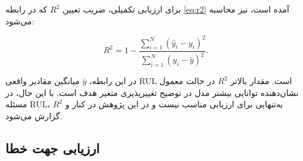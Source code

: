 برای ارزیابی تکمیلی، ضریب تعیین $R^2$ که در رابطه 
\ref{eq:r2}
آمده است، نیز محاسبه می‌شود:

\begin{equation}
	\label{eq:r2}
	R^2
	=
	1-
	\frac{
		\sum_{i=1}^{N}
		(\hat{y}_i-y_i)^2
	}{
		\sum_{i=1}^{N}
		(y_i-\bar{y})^2
	}.
\end{equation}

در این رابطه، $\bar{y}$ میانگین مقادیر واقعی \gls{RUL} است.
مقدار بالاتر $R^2$ در حالت معمول نشان‌دهنده توانایی بیشتر مدل در
توضیح تغییرپذیری متغیر هدف است. با این حال، در مسئله
\gls{RUL}،
 $R^2$
  به‌تنهایی برای ارزیابی مناسب نیست و در این
پژوهش در کنار  و  گزارش می‌شود.

\subsection{ارزیابی جهت خطا}
\label{sec:nasa-score}
%
%
%
%
%
%
%
%
%

